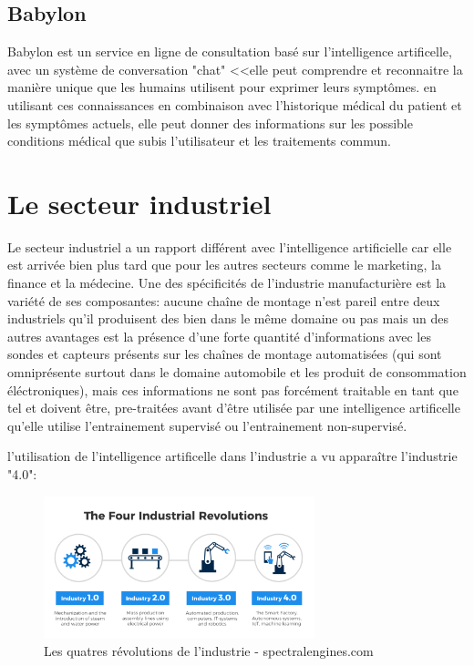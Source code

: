         \subsection{Babylon}
        Babylon est un service en ligne de consultation basé sur l'intelligence artificelle, 
        avec un système de conversation "chat" <<elle peut comprendre et reconnaitre la manière 
        unique que les humains utilisent pour exprimer leurs symptômes. en utilisant ces 
        connaissances en combinaison avec l'historique médical du patient et les symptômes
        actuels, elle peut donner des informations sur les possible conditions médical 
        que subis l'utilisateur et les traitements commun.
        \newpage


    \section{Le secteur industriel}
        Le secteur industriel a un rapport différent avec l'intelligence artificielle car elle est arrivée 
        bien plus tard que pour les autres secteurs comme le marketing, la finance et la médecine.
        Une des spécificités de l'industrie manufacturière est la variété de ses composantes: 
        aucune chaîne de montage n'est pareil entre deux industriels qu'il produisent des bien 
        dans le même domaine ou pas mais un des autres avantages est la présence d'une forte quantité 
        d'informations avec les sondes et capteurs présents sur les chaînes de montage automatisées 
        (qui sont omniprésente surtout dans le domaine automobile et les produit de consommation éléctroniques), 
        mais ces informations ne sont pas forcément traitable en tant que tel et doivent être, pre-traitées
        avant d'être utilisée par une intelligence artificelle qu'elle utilise l'entrainement 
        supervisé ou l'entrainement non-supervisé. \newline

        l'utilisation de l'intelligence artificelle dans l'industrie a vu apparaître 
        l'industrie "4.0":

        \begin{figure}[H]
            \centering
            \includegraphics[width=0.7\textwidth]{Images/industryfour}
            \caption{Les quatres révolutions de l'industrie - spectralengines.com}
            \label{fig:fourindustrialrevolutions}
        \end{figure}

